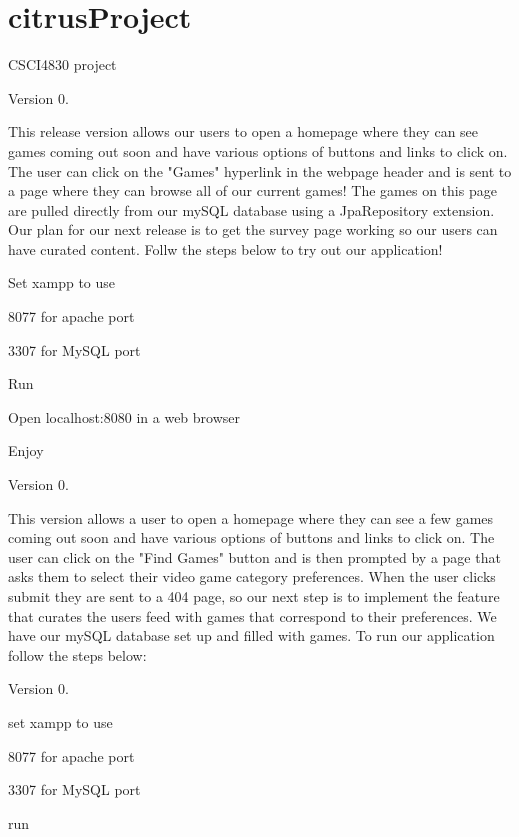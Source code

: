 \chapter{citrus\+Project}
\hypertarget{md_README}{}\label{md_README}
\label{md_README_autotoc_md0}%
%
CSCI4830 project

Version 0.

This release version allows our users to open a homepage where they can see games coming out soon and have various options of buttons and links to click on. The user can click on the "{}\+Games"{} hyperlink in the webpage header and is sent to a page where they can browse all of our current games! The games on this page are pulled directly from our my\+SQL database using a Jpa\+Repository extension. Our plan for our next release is to get the survey page working so our users can have curated content. Follw the steps below to try out our application!


\begin{DoxyEnumerate}
\item Set xampp to use
\end{DoxyEnumerate}
\begin{DoxyItemize}
\item 8077 for apache port
\item 3307 for My\+SQL port
\end{DoxyItemize}
\begin{DoxyEnumerate}
\item Run 
\item Open localhost\+:8080 in a web browser
\item Enjoy
\end{DoxyEnumerate}



Version 0.

This version allows a user to open a homepage where they can see a few games coming out soon and have various options of buttons and links to click on. The user can click on the "{}\+Find Games"{} button and is then prompted by a page that asks them to select their video game category preferences. When the user clicks submit they are sent to a 404 page, so our next step is to implement the feature that curates the users feed with games that correspond to their preferences. We have our my\+SQL database set up and filled with games. To run our application follow the steps below\+:



Version 0.

set xampp to use
\begin{DoxyItemize}
\item 8077 for apache port
\item 3307 for My\+SQL port
\end{DoxyItemize}

run  